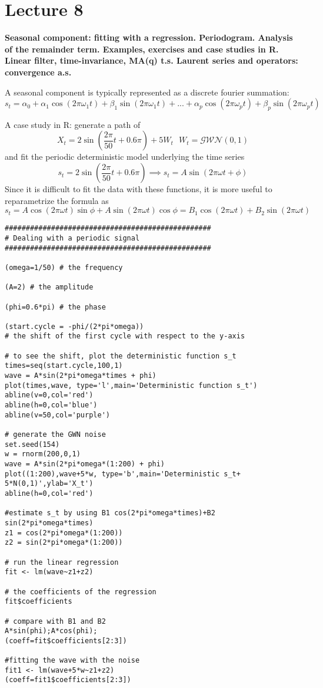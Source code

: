 \section{Lecture 8}
\label{lecture8}

\begin{center}
    \textbf{Seasonal component: fitting with a regression. Periodogram. Analysis of the remainder term. Examples, exercises and case studies in R. Linear filter, time-invariance, MA(q) t.s. Laurent series and operators: convergence a.s.}
\end{center}

A seasonal component is typically represented as a discrete fourier summation:
\[
    s_t=\alpha_0+\alpha_1\cos(2\pi\omega_1t)+\beta_1\sin(2\pi\omega_1t)+...+\alpha_p\cos(2\pi\omega_pt)+\beta_p\sin(2\pi\omega_pt)
\]

\begin{example}
    A case study in R: generate a path of
    \[
        X_t=2\sin\left(\frac{2\pi}{50}t+0.6\pi\right)+5W_t\ \ \ W_t=\mathcal{GWN}(0,1)  
    \]
    and fit the periodic deterministic model underlying the time series
    \[
        s_t=2\sin\left(\frac{2\pi}{50}t+0.6\pi\right) \implies s_t=A\sin(2\pi\omega t+\phi)
    \]
    Since it is difficult to fit the data with these functions, it is more useful to reparametrize the formula as
    \[
        s_t=A\cos(2\pi\omega t)\sin\phi+A\sin(2\pi\omega t)\cos\phi=B_1\cos(2\pi\omega t)+B_2\sin(2\pi\omega t)
    \]
    \begin{verbatim}
#################################################
# Dealing with a periodic signal
#################################################

(omega=1/50) # the frequency

(A=2) # the amplitude

(phi=0.6*pi) # the phase

(start.cycle = -phi/(2*pi*omega))
# the shift of the first cycle with respect to the y-axis

# to see the shift, plot the deterministic function s_t
times=seq(start.cycle,100,1)
wave = A*sin(2*pi*omega*times + phi)
plot(times,wave, type='l',main='Deterministic function s_t')
abline(v=0,col='red')
abline(h=0,col='blue')
abline(v=50,col='purple')

# generate the GWN noise
set.seed(154)
w = rnorm(200,0,1)
wave = A*sin(2*pi*omega*(1:200) + phi)
plot((1:200),wave+5*w, type='b',main='Deterministic s_t+ 5*N(0,1)',ylab='X_t')
abline(h=0,col='red')

#estimate s_t by using B1 cos(2*pi*omega*times)+B2 sin(2*pi*omega*times)
z1 = cos(2*pi*omega*(1:200))
z2 = sin(2*pi*omega*(1:200))

# run the linear regression
fit <- lm(wave~z1+z2)

# the coefficients of the regression
fit$coefficients

# compare with B1 and B2
A*sin(phi);A*cos(phi);
(coeff=fit$coefficients[2:3])

#fitting the wave with the noise
fit1 <- lm(wave+5*w~z1+z2)
(coeff=fit1$coefficients[2:3])
    \end{verbatim}
\end{example}

